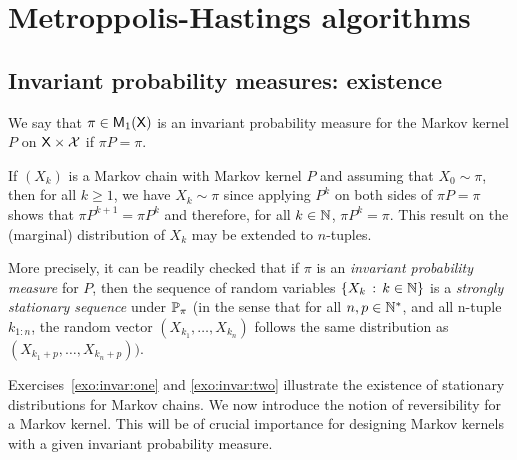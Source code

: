 \documentclass[english,graybox,envcountchap,envcountsame,sectrefs,shortlabels]{svmono}
\theoremstyle{style}
\renewenvironment{keywords}{\textit{\bf Keywords: } \sffamily }{}
\begin{document}
\chapter{Metroppolis-Hastings algorithms}
\minitoc
\section{Invariant probability measures: existence}
\begin{definition}
We say that $\pi\in\mathsf{M}_{1}(\mathsf{X})$ is an invariant probability measure
for the Markov kernel $P$ on $\mathsf{X}\times\mathcal{X}$ if $\pi P=\pi$.
\end{definition}

If $(X_{k})$ is a Markov chain with Markov kernel $P$
and assuming that $X_{0}\sim\pi$, then for all $k\geq1$, we have
$X_{k}\sim\pi$ since applying $P^{k}$ on
both sides of $\pi P=\pi$ shows that $\pi P^{k+1}=\pi P^{k}$ and
therefore, for all $k\in\mathbb{N}$, $\pi P^{k}=\pi$. This result on
the (marginal) distribution of $X_{k}$ may be extended to $n$-tuples.

More precisely, it can be readily checked that if $\pi$ is an \emph{invariant
probability measure }for $P$, then the sequence of random variables
$\left\{ X_{k}\,:\,k\in\mathbb{N}\right\}$ is a \emph{strongly stationary sequence}
under $\mathbb{P}_{\pi}$ (in the sense that for all $n,p\in\mathbb{N}^{*}$,
and all n-tuple $k_{1:n}$, the random vector $(X_{k_{1}},\ldots,X_{k_{n}})$
follows the same distribution as $(X_{k_{1}+p},\ldots,X_{k_{n}+p}))$.

Exercises~\ref{exo:invar:one} and \ref{exo:invar:two} illustrate the existence of stationary distributions for Markov chains.
We now introduce the notion of reversibility for a Markov kernel.
This will be of crucial importance for designing Markov kernels with
a given invariant probability measure.
\end{document}

